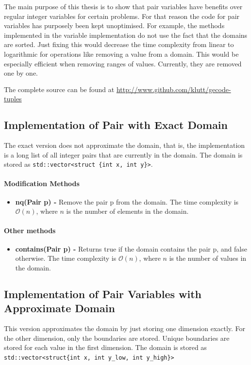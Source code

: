 \documentclass[a4paper,11pt]{article}
\begin{document}
The main purpose of this thesis is to show that pair variables have benefits over regular integer variables for certain problems. For that reason the code for pair variables has purposely been kept unoptimised. For example, the methods implemented in the variable implementation do not use the fact that the domains are sorted. Just fixing this would decrease the time complexity from linear to logarithmic for operations like removing a value from a domain. This would be especially efficient when removing ranges of values. Currently, they are removed one by one.

The complete source can be found at \url{http://www.github.com/klutt/gecode-tuples}

\subsection{Implementation of Pair with Exact Domain}
The exact version does not approximate the domain, that is, the implementation is a long list of all integer pairs that are currently in the domain. The domain is stored as \texttt{std::vector<struct \{int x, int y\}>}. 

\paragraph{Modification Methods}
\begin{itemize}
\item {\textbf{nq(Pair p) - }} Remove the pair p from the domain. The time complexity is $\mathcal{O}(n)$, where $n$ is the number of elements in the domain.
\end{itemize}

\paragraph{Other methods}
\begin{itemize}
\item {\textbf{contains(Pair p) - }} Returns true if the domain contains the pair p, and false otherwise. The time complexity is  $\mathcal{O}(n)$, where $n$ is the number of values in the domain.
\end{itemize}

\subsection{Implementation of Pair Variables with Approximate Domain}
\label{sec:impapprox}
This version approximates the domain by just storing one dimension exactly. For the other dimension, only the boundaries are stored. Unique boundaries are stored for each value in the first dimension. The domain is stored as \texttt{std::vector<struct\{int x, int y\_low, int y\_high\}>}
\end{document}
